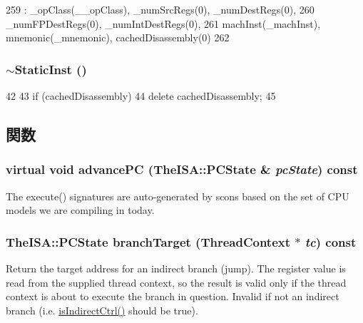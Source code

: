 \begin{DoxyCode}
259         : _opClass(__opClass), _numSrcRegs(0), _numDestRegs(0),
260           _numFPDestRegs(0), _numIntDestRegs(0),
261           machInst(_machInst), mnemonic(_mnemonic), cachedDisassembly(0)
262     { }
\end{DoxyCode}
\hypertarget{classStaticInst_ae03a0a2cb317b469b56cd94cf0a66f15}{
\subsubsection[{$\sim$StaticInst}]{\setlength{\rightskip}{0pt plus 5cm}$\sim${\bf StaticInst} ()}}
\label{classStaticInst_ae03a0a2cb317b469b56cd94cf0a66f15}



\begin{DoxyCode}
42 {
43     if (cachedDisassembly)
44         delete cachedDisassembly;
45 }
\end{DoxyCode}


\subsection{関数}
\hypertarget{classStaticInst_afcd40c91dfbadd47b31d4ce2fc7fa777}{
\subsubsection[{advancePC}]{\setlength{\rightskip}{0pt plus 5cm}virtual void advancePC (TheISA::PCState \& {\em pcState}) const}}
\label{classStaticInst_afcd40c91dfbadd47b31d4ce2fc7fa777}
The execute() signatures are auto-\/generated by scons based on the set of CPU models we are compiling in today. \hypertarget{classStaticInst_ad126194d9e34405bfc297b8b028f640d}{
\subsubsection[{branchTarget}]{\setlength{\rightskip}{0pt plus 5cm}TheISA::PCState branchTarget ({\bf ThreadContext} $\ast$ {\em tc}) const}}
\label{classStaticInst_ad126194d9e34405bfc297b8b028f640d}
Return the target address for an indirect branch (jump). The register value is read from the supplied thread context, so the result is valid only if the thread context is about to execute the branch in question. Invalid if not an indirect branch (i.e. \hyperlink{classStaticInst_a5dfa427a48589c4c910416a67808510f}{isIndirectCtrl()} should be true). 

